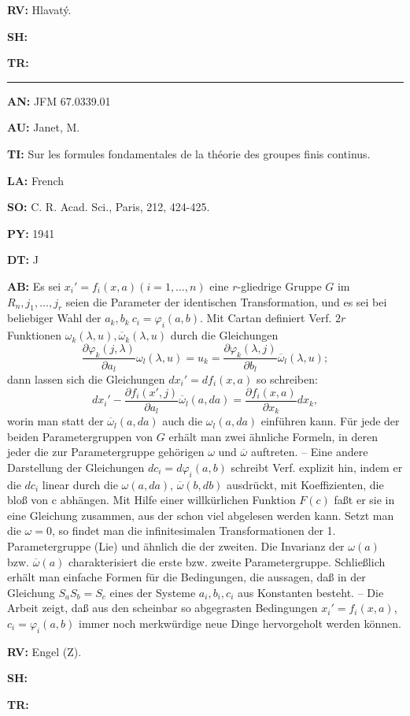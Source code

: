 \item{\bf RV:} Hlavat\'y.
\item{\bf SH:}
\item{\bf TR:}

\bigskip\par\noindent\hrule\bigskip\par

\item{\bf AN:} JFM 67.0339.01
\item{\bf AU:} Janet, M.
\item{\bf TI:} Sur les formules fondamentales de la th\'eorie des groupes
finis continus.
\item{\bf LA:} French
\item{\bf SO:} C. R. Acad. Sci., Paris, 212, 424-425.
\item{\bf PY:} 1941
\item{\bf DT:} J
\item{\bf AB:}{\parindent15pt
 Es sei $x_i' = f_i(x,a)(i = 1,\ldots, n)$ eine $r$-gliedrige Gruppe
$G$ im $R_n, j_1,\ldots,j_r$
seien die Parameter
der identischen Transformation, und es sei bei beliebiger Wahl
der $a_k, b_k \ c_i = \varphi_ i(a, b)$. Mit Cartan definiert Verf.
$2r$ Funktionen $\omega_k(\lambda, u), \overline{\omega}_k(\lambda , u)$
durch die Gleichungen
$$
\dfrac{\partial \varphi_k(j, \lambda)}{\partial a_l}\omega_l(\lambda , u)=u_k=
\dfrac{\partial \varphi_k(\lambda, j)}{\partial b_l}\overline{\omega}_l(\lambda , u);
$$
dann lassen sich die Gleichungen $dx_i' = df_i(x, a)$ so schreiben:
$$
dx_i'-\dfrac{\partial f_i(x', j)}{\partial a_l}\overline{\omega}_l(a , da)=
\dfrac{\partial f_i(x, a)}{\partial x_k}dx_k,
$$
worin man statt der
$\overline{\omega}_l(a, da)$ auch die $\omega_l(a,da)$ einf\"uhren kann. F\"ur jede der
beiden Parametergruppen
von $G$ erh\"alt man zwei \"ahnliche Formeln, in deren jeder
die zur Parametergruppe
geh\"origen $\omega$ und $\overline{\omega}$ auftreten. --
Eine andere Darstellung
der Gleichungen $dc_i=d\varphi_i (a, b)$ schreibt Verf. explizit hin, indem er die $dc_i$ linear
durch die $\omega(a, da)$,
$\overline{\omega}(b, db)$ ausdr\"uckt, mit Koeffizienten, die blo{\ss} von c
abh\"angen.
Mit Hilfe einer willk\"urlichen Funktion $F(c)$ fa{\ss}t er sie in eine
Gleichung  zusammen, aus der
schon viel abgelesen
werden kann. Setzt man die $\omega = 0$, so findet man die
infinitesimalen Transformationen der 1. Parametergruppe (Lie) und \"ahnlich die
der zweiten. Die Invarianz
der $\omega(a)$ bzw. $\overline{\omega}(a)$ charakterisiert die erste bzw. zweite
Parametergruppe. Schlie{\ss}lich erh\"alt man einfache Formen f\"ur die
Bedingungen,
die aussagen, da{\ss}
in der Gleichung $S_aS_b = S_c$ eines der Systeme $a_i,b_i, c_i$ aus
Konstanten besteht. -- Die Arbeit zeigt, da{\ss} aus den scheinbar so abgegrasten
Bedingungen $x_i'=f_i(x, a)$, $c_i=\varphi_i(a,b)$
immer noch merkw\"urdige neue Dinge
hervorgeholt
werden k\"onnen.
}
\item{\bf RV:} Engel (Z).
\item{\bf SH:}
\item{\bf TR:}

